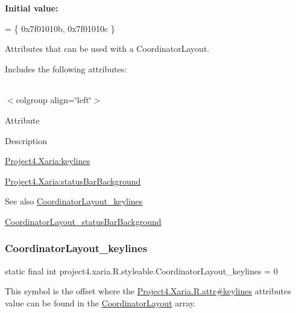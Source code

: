 {\bfseries Initial value\+:}
\begin{DoxyCode}
= \{
            0x7f01010b, 0x7f01010c
        \}
\end{DoxyCode}
Attributes that can be used with a Coordinator\+Layout. 

Includes the following attributes\+:

\tabulinesep=1mm
\begin{longtabu} spread 0pt [c]{*{0}{|X[-1]}|}
\hline
\end{longtabu}
$<$colgroup align=\char`\"{}left\char`\"{}$>$ 

Attribute

Description 

{\ttfamily \hyperlink{classproject4_1_1xaria_1_1R_1_1styleable_ab963e2c454e0f5352140c6bb4342351c}{Project4.\+Xaria\+:keylines}}

{\ttfamily \hyperlink{classproject4_1_1xaria_1_1R_1_1styleable_a844b169229d25fbc371d4d62c12462f8}{Project4.\+Xaria\+:status\+Bar\+Background}}

\begin{DoxySeeAlso}{See also}
\hyperlink{classproject4_1_1xaria_1_1R_1_1styleable_ab963e2c454e0f5352140c6bb4342351c}{Coordinator\+Layout\+\_\+keylines} 

\hyperlink{classproject4_1_1xaria_1_1R_1_1styleable_a844b169229d25fbc371d4d62c12462f8}{Coordinator\+Layout\+\_\+status\+Bar\+Background} 
\end{DoxySeeAlso}
\mbox{\label{classproject4_1_1xaria_1_1R_1_1styleable_ab963e2c454e0f5352140c6bb4342351c}} 
\subsubsection{\texorpdfstring{Coordinator\+Layout\+\_\+keylines}{CoordinatorLayout\_keylines}}
{\footnotesize\ttfamily static final int project4.\+xaria.\+R.\+styleable.\+Coordinator\+Layout\+\_\+keylines = 0\hspace{0.3cm}{\ttfamily [static]}}

This symbol is the offset where the \hyperlink{}{Project4.\+Xaria.\+R.\+attr\#keylines} attribute\textquotesingle{}s value can be found in the \hyperlink{classproject4_1_1xaria_1_1R_1_1styleable_abe1865e41984c448731db5ef335746e0}{Coordinator\+Layout} array.

